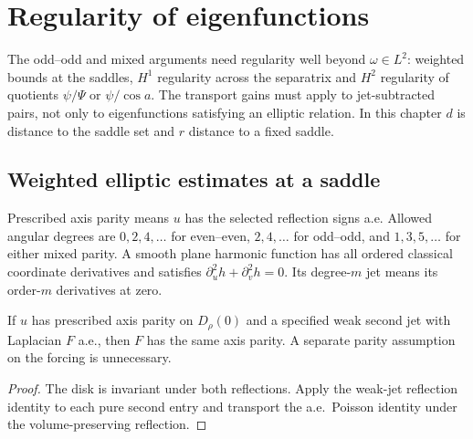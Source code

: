 \chapter{Regularity of eigenfunctions}
\label{chap:regularity}

The odd--odd and mixed arguments need regularity well beyond
$\omega\in L^2$: weighted bounds at the saddles, $H^1$ regularity across the
separatrix and $H^2$ regularity of quotients $\psi/\Psi$ or $\psi/\cos a$.
The transport gains must apply to jet-subtracted pairs, not only to
eigenfunctions satisfying an elliptic relation.
In this chapter $d$ is distance to the saddle set and $r$ distance to a fixed saddle.

\section{Weighted elliptic estimates at a saddle}

\begin{definition}
\label{def:cylinder-inverse-data}
\leanok
Prescribed axis parity means $u$ has the selected reflection signs a.e.
Allowed angular degrees are $0,2,4,\ldots$ for even--even,
$2,4,\ldots$ for odd--odd, and $1,3,5,\ldots$ for either mixed parity.
A smooth plane harmonic function has all ordered classical coordinate
derivatives and satisfies $\partial_u^2h+\partial_v^2h=0$.
Its degree-$m$ jet means its order-$m$ derivatives at zero.
\end{definition}

\begin{lemma}
\label{lem:cylinder-forcing-parity}
\leanok
If $u$ has prescribed axis parity on $D_\rho(0)$ and a specified weak
second jet with Laplacian $F$ a.e., then $F$ has the same axis parity.
A separate parity assumption on the forcing is unnecessary.
\end{lemma}

\begin{proof}
\leanok
The disk is invariant under both reflections. Apply the weak-jet reflection
identity to each pure second entry and transport the a.e.\ Poisson identity
under the volume-preserving reflection.
\end{proof}

